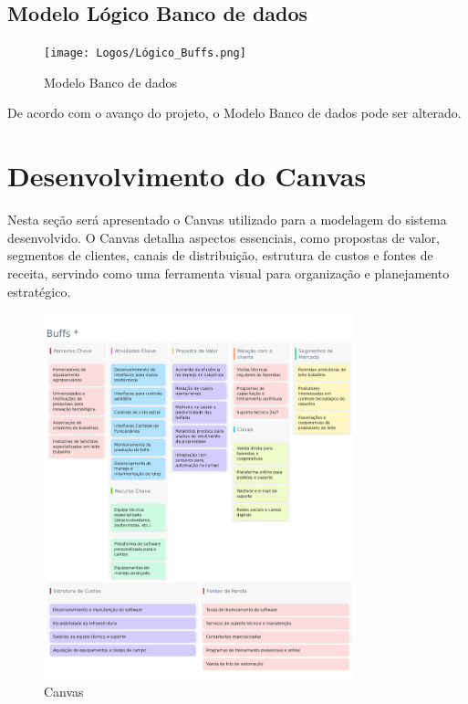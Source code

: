 \documentclass[
  a4paper,%
  12pt,%
  english,%
  brazilian,%
]{article}
\begin{document}
\subsection*{Modelo Lógico Banco de dados}

     \begin{figure}[h]
\centering
\caption{Modelo Banco de dados}%
\label{fig:modelo-conceitual}
\texttt{[image: Logos/Lógico\_Buffs.png]}
\end{figure}
De acordo com o avanço do projeto, o Modelo Banco de dados pode ser alterado.


\newpage
\section*{Desenvolvimento do Canvas}
Nesta seção será apresentado o Canvas utilizado para a modelagem do sistema desenvolvido. O Canvas detalha aspectos essenciais, como propostas de valor, segmentos de clientes, canais de distribuição, estrutura de custos e fontes de receita, servindo como uma ferramenta visual para organização e planejamento estratégico.
     \begin{figure}[h]
\centering
\caption{Canvas}%
\label{fig:canvas}
\includegraphics[width=0.8\textwidth]{Logos/Canvas.png}
\end{figure}
\end{document}
